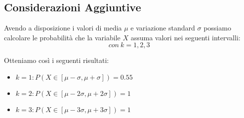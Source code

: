 \subsection{Considerazioni Aggiuntive}
Avendo a disposizione i valori di media $\mu$ e variazione standard $\sigma$ possiamo calcolare le probabilità che la variabile $X$ assuma valori nei seguenti intervalli:
\begin{equation*}
	[\mu-k\sigma, \mu+k\sigma]\ con\ k=1,2,3
\end{equation*} 

Otteniamo così i seguenti risultati:
\begin{itemize}
    \item $k=1: P(X \in [\mu-\sigma, \mu+\sigma]) = 0.55$
    \item $k=2: P(X \in [\mu-2\sigma, \mu+2\sigma]) = 1$
    \item $k=3: P(X \in [\mu-3\sigma, \mu+3\sigma]) = 1$
\end{itemize}

